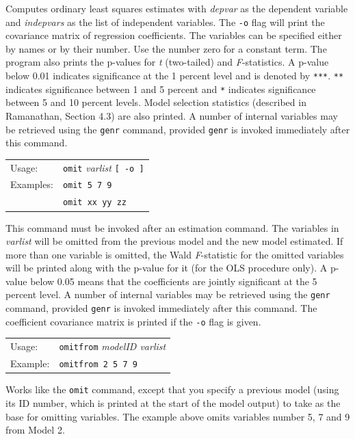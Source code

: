\documentclass{article}
\begin{document}
{Computes ordinary least squares estimates with \textit{depvar} as the
dependent variable and \textit{indepvars} as the list of independent
variables.  The \texttt{-o} flag will print the covariance matrix of
regression coefficients.  The variables can be specified either by
names or by their number.  Use the number zero for a constant term.
The program also prints the p-values for \textit{t} (two-tailed) and
\textit{F}-statistics.  A p-value below 0.01 indicates significance at
the 1 percent level and is denoted by \texttt{***}.  \texttt{**}
indicates significance between 1 and 5 percent and \texttt{*}
indicates significance between 5 and 10 percent levels.  Model
selection statistics (described in Ramanathan, Section 4.3) are also
printed.  A number of internal variables may be retrieved using the
\texttt{genr} command, provided \texttt{genr} is invoked immediately
after this command.


\begin{tabular}{ll}
Usage:  &        \texttt{omit} \textit{varlist} \texttt{[ -o ]}\\
Examples:  &     \texttt{omit 5 7 9} \\
           &     \texttt{omit xx yy zz}
\end{tabular}

This command must be invoked after an estimation command.  The
variables in \textit{varlist} will be omitted from the previous model
and the new model estimated.  If more than one variable is omitted,
the Wald \textit{F}-statistic for the omitted variables will be
printed along with the p-value for it (for the OLS procedure only).  A
p-value below 0.05 means that the coefficients are jointly significant
at the 5 percent level.  A number of internal variables may be
retrieved using the \texttt{genr} command, provided \texttt{genr} is
invoked immediately after this command.  The coefficient covariance
matrix is printed if the \texttt{-o} flag is given.


\begin{tabular}{ll}
Usage:  &        \texttt{omitfrom} \textit{modelID varlist} \\
Example: &       \texttt{omitfrom 2 5 7 9}
\end{tabular}
           
Works like the \texttt{omit} command, except that you specify a
previous model (using its ID number, which is printed at the start of
the model output) to take as the base for omitting variables.  The
example above omits variables number 5, 7 and 9 from Model 2.

}
\end{document}
